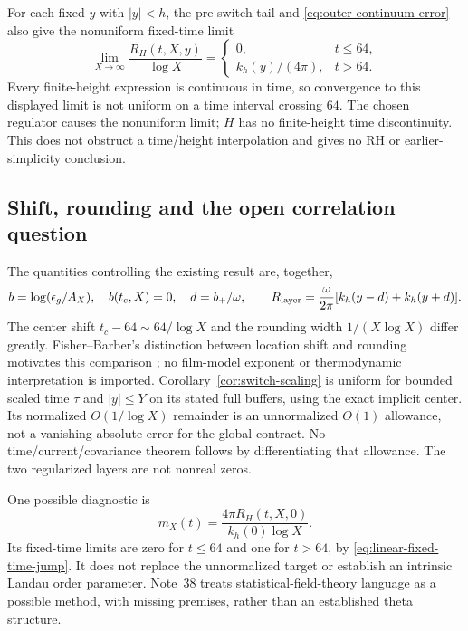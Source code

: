 For each fixed $y$ with $|y|<h$, the pre-switch tail and
\eqref{eq:outer-continuum-error} also give the nonuniform fixed-time
limit
\begin{equation}
 \lim_{X\to\infty}\frac{R_H(t,X,y)}{\log X}
 =\begin{cases}
 0,&t\le64,\\
 k_h(y)/(4\pi),&t>64.
 \end{cases}
 \label{eq:linear-fixed-time-jump}
\end{equation}
Every finite-height expression is continuous in time, so convergence
to this displayed limit is not uniform on a time interval crossing
$64$.  The chosen regulator causes the nonuniform limit; $H$ has no
finite-height time discontinuity.  This does not obstruct a time/height
interpolation and gives no RH or earlier-simplicity conclusion.

\subsection{Shift, rounding and the open correlation question}
\label{sec:crossover-outlook}
The quantities controlling the existing result are, together,
\begin{equation}
 b=\log(\epsilon_g/A_X),\quad b(t_c,X)=0,\quad d=b_+/\omega,
 \qquad R_{\rm layer}=\frac{\omega}{2\pi}
          [k_h(y-d)+k_h(y+d)].
 \label{eq:crossover-interpretation}
\end{equation}
The center shift $t_c-64\sim64/\log X$ and the rounding width
$1/(X\log X)$ differ greatly. Fisher--Barber's distinction between
location shift and rounding motivates this comparison \cite{fisherbarber};
no film-model exponent or thermodynamic interpretation is imported.
Corollary~\ref{cor:switch-scaling} is uniform for bounded scaled time
$\tau$ and $|y|\le Y$ on its stated full buffers, using the exact implicit
center. Its normalized $O(1/\log X)$ remainder is an unnormalized $O(1)$
allowance, not a vanishing absolute error for the global contract.
No time/current/covariance theorem follows by differentiating that allowance.
The two regularized layers are not nonreal zeros.

One possible diagnostic is
\begin{equation}
 m_X(t)=\frac{4\pi R_H(t,X,0)}{k_h(0)\log X}.
 \label{eq:crossover-diagnostic}
\end{equation}
Its fixed-time limits are zero for $t\le64$ and one for $t>64$, by
\eqref{eq:linear-fixed-time-jump}. It does not replace the unnormalized
target or establish an intrinsic Landau order parameter. Note~38
\cite{n38} treats statistical-field-theory language as a possible method,
with missing premises, rather than an established theta structure.

